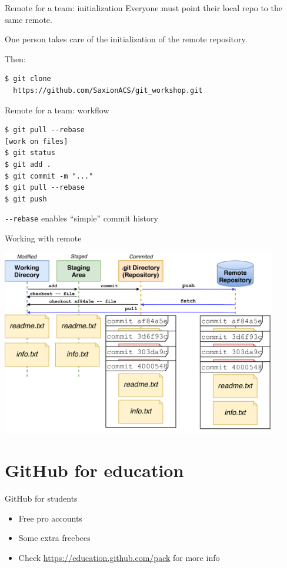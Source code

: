 \documentclass[
  11pt,
  american,
  ignorenonframetext,
  aspectratio=43,
  compress,
  xcolor=dvipsnames]{beamer}
\providecommand{\tightlist}{%
  \setlength{\itemsep}{0pt}\setlength{\parskip}{0pt}}
\begin{document}
\begin{frame}[fragile]{Remote for a team: initialization}
\protect\hypertarget{remote-for-a-team-initialization}{}
Everyone must point their local repo to the same remote.

One person takes care of the initialization of the remote repository.

Then:

\begin{verbatim}
$ git clone 
  https://github.com/SaxionACS/git_workshop.git
\end{verbatim}
\end{frame}

\begin{frame}[fragile]{Remote for a team: workflow}
\protect\hypertarget{remote-for-a-team-workflow}{}
\begin{verbatim}
$ git pull --rebase
[work on files]
$ git status
$ git add .
$ git commit -m "..."
$ git pull --rebase
$ git push
\end{verbatim}

\texttt{-\/-rebase} enables ``simple'' commit history
\end{frame}

\begin{frame}{Working with remote}
\protect\hypertarget{working-with-remote}{}
\begin{center}
\includegraphics[width=0.9\textwidth]{./images/git_workflow_remote.pdf}
\end{center}
\end{frame}

\hypertarget{github-for-education}{%
\section{GitHub for education}\label{github-for-education}}

\begin{frame}{GitHub for students}
\protect\hypertarget{github-for-students}{}
\begin{itemize}
\tightlist
\item
  Free pro accounts
\item
  Some extra freebees
\item
  Check \url{https://education.github.com/pack} for more info
\end{itemize}
\end{frame}
\end{document}
